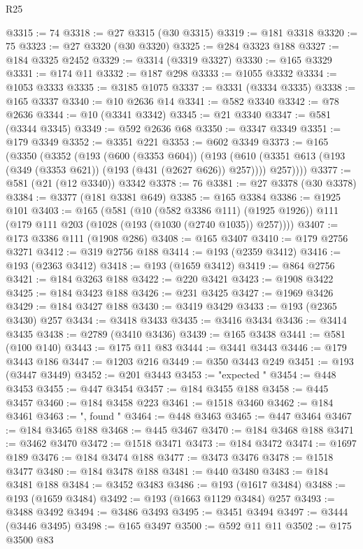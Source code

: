 \begin{lexlean}{R25}
\begin{coremodule}
@3315 := 74
@3318 := @27 @3315 (@30 @3315)
@3319 := @181 @3318
@3320 := 75
@3323 := @27 @3320 (@30 @3320)
@3325 := @284 @3323 @188
@3327 := @184 @3325 @2452
@3329 := @3314 (@3319 @3327)
@3330 := @165 @3329
@3331 := @174 @11
@3332 := @187 @298
@3333 := @1055 @3332
@3334 := @1053 @3333
@3335 := @3185 @1075
@3337 := @3331 (@3334 @3335)
@3338 := @165 @3337
@3340 := @10 @2636 @14
@3341 := @582 @3340
@3342 := @78 @2636
@3344 := @10 (@3341 @3342)
@3345 := @21 @3340
@3347 := @581 (@3344 @3345)
@3349 := @592 @2636 @68
@3350 := @3347 @3349
@3351 := @179 @3349
@3352 := @3351 @221
@3353 := @602 @3349
@3373 := @165
    (@3350
      (@3352
        (@193
          (@600 (@3353 @604))
          (@193
            (@610 (@3351 @613 (@193 (@349 (@3353 @621)) (@193 (@431 (@2627 @626)) @257))))
            @257))))
@3377 := @581 (@21 (@12 @3340)) @3342
@3378 := 76
@3381 := @27 @3378 (@30 @3378)
@3384 := @3377 (@181 @3381 @649)
@3385 := @165 @3384
@3386 := @1925 @101
@3403 := @165
    (@581
      (@10 (@582 @3386 @111) (@1925 @1926))
      @111
      (@179 @111 @203 (@1028 (@193 (@1030 (@2740 @1035)) @257))))
@3407 := @173 @3386 @111 (@1908 @286)
@3408 := @165 @3407
@3410 := @179 @2756 @3271
@3412 := @319 @2756 @188
@3414 := @193 (@2359 @3412)
@3416 := @193 (@2363 @3412)
@3418 := @193 (@1659 @3412)
@3419 := @864 @2756
@3421 := @184 @3263 @188
@3422 := @220 @3421
@3423 := @1908 @3422
@3425 := @184 @3423 @188
@3426 := @231 @3425
@3427 := @1969 @3426
@3429 := @184 @3427 @188
@3430 := @3419 @3429
@3433 := @193 (@2365 @3430) @257
@3434 := @3418 @3433
@3435 := @3416 @3434
@3436 := @3414 @3435
@3438 := @2789 (@3410 @3436)
@3439 := @165 @3438
@3441 := @581 (@100 @140)
@3443 := @175 @11 @83
@3444 := @3441 @3443
@3446 := @179 @3443 @186
@3447 := @1203 @216
@3449 := @350 @3443 @249
@3451 := @193 (@3447 @3449)
@3452 := @201 @3443
@3453 := "expected "
@3454 := @448 @3453
@3455 := @447 @3454
@3457 := @184 @3455 @188
@3458 := @445 @3457
@3460 := @184 @3458 @223
@3461 := @1518 @3460
@3462 := @184 @3461
@3463 := ", found "
@3464 := @448 @3463
@3465 := @447 @3464
@3467 := @184 @3465 @188
@3468 := @445 @3467
@3470 := @184 @3468 @188
@3471 := @3462 @3470
@3472 := @1518 @3471
@3473 := @184 @3472
@3474 := @1697 @189
@3476 := @184 @3474 @188
@3477 := @3473 @3476
@3478 := @1518 @3477
@3480 := @184 @3478 @188
@3481 := @440 @3480
@3483 := @184 @3481 @188
@3484 := @3452 @3483
@3486 := @193 (@1617 @3484)
@3488 := @193 (@1659 @3484)
@3492 := @193 (@1663 @1129 @3484) @257
@3493 := @3488 @3492
@3494 := @3486 @3493
@3495 := @3451 @3494
@3497 := @3444 (@3446 @3495)
@3498 := @165 @3497
@3500 := @592 @11 @11
@3502 := @175 @3500 @83

\end{coremodule}
\end{lexlean}
